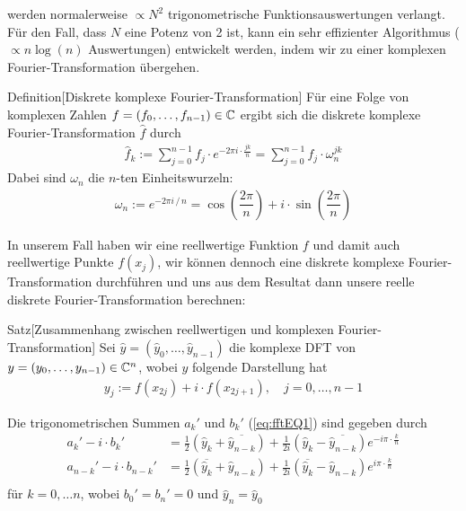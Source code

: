 werden normalerweise $\propto N^2$ trigonometrische Funktionsauswertungen verlangt. Für den Fall, dass $N$ eine 
Potenz von 2 ist, kann ein sehr effizienter Algorithmus ($\propto n\log(n)$ Auswertungen) entwickelt werden, 
indem wir zu einer komplexen Fourier-Transformation übergehen.


\begin{colbox}{Definition}[Diskrete komplexe Fourier-Transformation]
  Für eine Folge von komplexen Zahlen $f=(f_0,\dots,f_{n-1})\in\mathbb C$ ergibt sich die diskrete 
  komplexe Fourier-Transformation $\hat{f}$ durch
  \begin{align*}
    \hat{f}_k := \sum_{j=0}^{n-1} f_j\cdot e^{-2\pi i\cdot\frac{jk}{n}} = \sum_{j=0}^{n-1} f_j\cdot \omega_n^{jk}
  \end{align*}
  Dabei sind $\omega_n$ die $n$-ten Einheitswurzeln:
  \begin{align*}
    \omega_n := e^{-2\pi i \,/\,n} = \cos\left(\dfrac{2\pi}{n}\right)+i\cdot\sin\left(\dfrac{2\pi}{n}\right)
  \end{align*}
\end{colbox}

In unserem Fall haben wir eine reellwertige Funktion $f$ und damit auch reellwertige Punkte $f(x_j)$, 
wir können dennoch eine diskrete komplexe Fourier-Transformation durchführen und uns aus dem Resultat 
dann unsere reelle diskrete Fourier-Transformation berechnen:

\begin{colbox}{Satz}[Zusammenhang zwischen reellwertigen und komplexen Fourier-Transformation]
  Sei $\hat{y}=(\hat{y}_0,\dots,\hat{y}_{n-1})$ die komplexe DFT von 
  $y=(y_0,\dots,y_{n-1})\in\mathbb C^n$, wobei $y$ folgende Darstellung hat
  \begin{align*}
    y_j := f(x_{2j}) + i\cdot f(x_{2j+1}), \quad j=0,\dots, n-1
  \end{align*}
  
  Die trigonometrischen Summen $a_k'$ und $b_k'$ (\ref{eq:fftEQ1}) sind gegeben durch
  \begin{align*}
    a_k' - i\cdot b_k'
    &= \tfrac{1}{2}(\hat{y}_k + \overline{\hat{y}_{n-k}}) 
    + \tfrac{1}{2i}(\hat{y}_k - \overline{\hat{y}_{n-k}})e^{-i\pi\cdot\tfrac{k}{n}} \\
    a_{n-k}' - i\cdot b_{n-k}'
    &= \tfrac{1}{2}(\overline{\hat{y}_k} + \hat{y}_{n-k}) 
    + \tfrac{1}{2i}(\overline{\hat{y}_k} - \hat{y}_{n-k})e^{i\pi\cdot\tfrac{k}{n}} \\
  \end{align*}
  für $k=0,\dots n$, wobei $b_0'=b_n'=0$ und $\hat{y}_n=\hat{y}_0$
\end{colbox}

